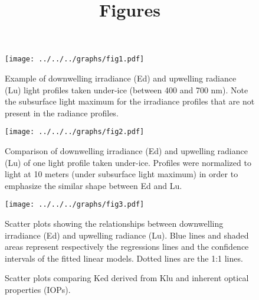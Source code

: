 \documentclass[12pt,a4paper]{scrartcl}
\title{Figures}
\date{}
\begin{document}
    \maketitle

     \begin{figure}[ht]
         \centering
         \texttt{[image: ../../../graphs/fig1.pdf]}
         \caption{Example of downwelling irradiance (Ed) and upwelling radiance (Lu) light profiles taken under-ice (between 400 and 700 nm). Note the subsurface light maximum for the irradiance profiles that are not present in the radiance profiles.}
     \end{figure}

    \clearpage
    \newpage

    \begin{figure}[ht]
        \centering
        \texttt{[image: ../../../graphs/fig2.pdf]}
        \caption{Comparison of downwelling irradiance (Ed) and upwelling radiance (Lu) of one light profile taken under-ice. Profiles were normalized to light at 10 meters (under subsurface light maximum) in order to emphasize the similar shape between Ed and Lu.}
    \end{figure}

    \clearpage
    \newpage

    \begin{figure}[ht]
        \centering
        \texttt{[image: ../../../graphs/fig3.pdf]}
        \caption{Scatter plots showing the relationships between downwelling irradiance (Ed) and upwelling radiance (Lu). Blue lines and shaded areas represent respectively the regressions lines and the confidence intervals of the fitted linear models. Dotted lines are the 1:1 lines.}
    \end{figure}

    \clearpage
    \newpage

    \begin{figure}[ht]
        \centering
        \caption{Scatter plots comparing Ked derived from Klu and inherent optical properties (IOPs).}
    \end{figure}

    
\end{document}
